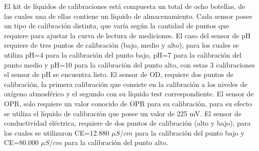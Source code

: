 El kit de l\'iquidos de calibraciones est\'a compuesta un total de ocho botellas, de las cuales una de ellas contiene un l\'iquido de almacenamiento. Cada sensor posee un tipo de calibraci\'on distinta, que var\'ia seg\'un la cantidad de puntos que requiere para ajustar la curva de lectura de mediciones.
El caso del sensor de pH requiere de tres puntos de calibración (bajo, medio y alto), para los cuales se utiliza pH=4 para la calibraci\'on del punto bajo, pH=7 para la calibraci\'on del punto medio y pH=10 para la calibraci\'on del punto alto, con estas 3 calibraciones el sensor de pH se encuentra listo.
El sensor de OD, requiere dos puntos de calibraci\'on, la primera calibraci\'on que consiste en la calibraci\'on a los niveles de ox\'igeno atmosf\'erico y el segundo con su l\'iquido test correspondiente.
El sensor de OPR, solo requiere un valor conocido de OPR para su calibraci\'on, para su efecto se utiliza el l\'iquido de calibraci\'on que posee un valor de 225 mV.
El sensor de conductividad el\'ectrica, requiere de dos puntos de calibraci\'on (alto y bajo), para los cuales se utilizaron CE=12.880 $\mu S/cm$ para la calibraci\'on del punto bajo y CE=80.000 $\mu S/cm$ para la calibraci\'on del punto alto.

